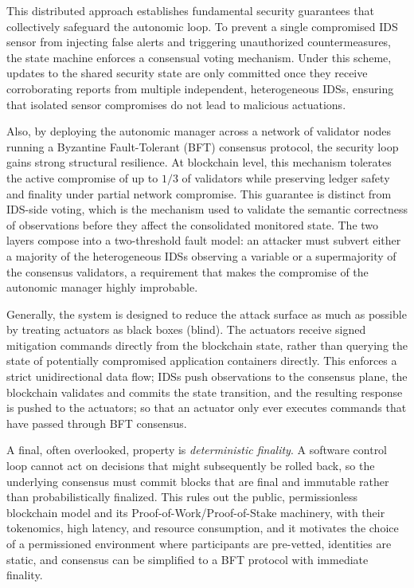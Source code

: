 This distributed approach establishes fundamental security guarantees that collectively safeguard the autonomic loop. To prevent a single compromised IDS sensor from injecting false alerts and triggering unauthorized countermeasures, the state machine enforces a consensual voting mechanism. Under this scheme, updates to the shared security state are only committed once they receive corroborating reports from multiple independent, heterogeneous IDSs, ensuring that isolated sensor compromises do not lead to malicious actuations.

Also, by deploying the autonomic manager across a network of validator nodes running a Byzantine Fault-Tolerant (BFT) consensus protocol, the security loop gains strong structural resilience. At blockchain level, this mechanism tolerates the active compromise of up to $1/3$ of validators while preserving ledger safety and finality under partial network compromise. This guarantee is distinct from IDS-side voting, which is the mechanism used to validate the semantic correctness of observations before they affect the consolidated monitored state. The two layers compose into a two-threshold fault model: an attacker must subvert either a majority of the heterogeneous IDSs observing a variable or a supermajority of the consensus validators, a requirement that makes the compromise of the autonomic manager highly improbable.

Generally, the system is designed to reduce the attack surface as much as possible by treating actuators as black boxes (blind). The actuators receive signed mitigation commands directly from the blockchain state, rather than querying the state of potentially compromised application containers directly. This enforces a strict unidirectional data flow; IDSs push observations to the consensus plane, the blockchain validates and commits the state transition, and the resulting response is pushed to the actuators; so that an actuator only ever executes commands that have passed through BFT consensus.

A final, often overlooked, property is \emph{deterministic finality}. A software control loop cannot act on decisions that might subsequently be rolled back, so the underlying consensus must commit blocks that are final and immutable rather than probabilistically finalized. This rules out the public, permissionless blockchain model and its Proof-of-Work/Proof-of-Stake machinery, with their tokenomics, high latency, and resource consumption, and it motivates the choice of a permissioned environment where participants are pre-vetted, identities are static, and consensus can be simplified to a BFT protocol with immediate finality.

